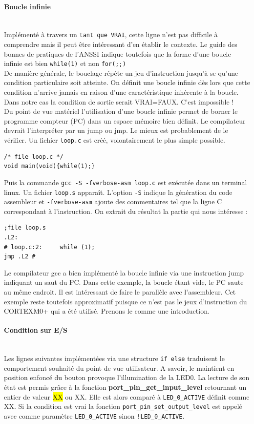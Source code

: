 \documentclass[a4paper]{article}
\begin{document}
\paragraph{Boucle infinie}
~~\\
Implémenté à travers un \texttt{tant que VRAI}, cette ligne n'est pas difficile à comprendre mais il peut être intéressant d'en établir le contexte. Le guide des bonnes de pratiques de l'ANSSI\cite{ANSSI2021} indique toutefois que la forme d'une boucle infinie est bien \texttt{while(1)} et non \texttt{for(;;)}\\
De manière générale, le bouclage répète un jeu d'instruction jusqu'à se qu'une condition particulaire soit atteinte. On définit une boucle infinie dès lors que cette condition n'arrive jamais en raison d'une caractéristique inhérente à la boucle. Dans notre cas la condition de sortie serait VRAI=FAUX. C'est impossible ! \\
Du point de vue matériel l'utilisation d'une boucle infinie permet de borner le programme compteur (PC) dans un espace mémoire bien définit. Le compilateur devrait l'interpréter par un jump ou jmp. Le mieux est probablement de le vérifier. Un fichier \texttt{loop.c} est créé, volontairement le plus simple possible.
\begin{lstlisting}[style=CStyle]
/* file loop.c */
void main(void){while(1);}
\end{lstlisting}
Puis la commande \texttt{gcc -S -fverbose-asm loop.c} est exécutée dans un terminal linux. Un fichier \texttt{loop.s} apparaît. L'option \texttt{-S} indique la génération du code assembleur et \texttt{-fverbose-asm} ajoute des commentaires tel que la ligne C correspondant à l'instruction. On extrait du résultat la partie qui nous intéresse :
\begin{lstlisting}[language={[x86masm]Assembler}]
;file loop.s
.L2:
# loop.c:2: 	while (1);
jmp	.L2	#
\end{lstlisting}
Le compilateur gcc a bien implémenté la boucle infinie via une instruction jump indiquant un saut du PC. Dans cette exemple, la boucle étant vide, le PC saute au même endroit. Il est intéressant de faire le parallèle avec l'assembleur. Cet exemple reste toutefois approximatif puisque ce n'est pas le jeux d'instruction du CORTEXM0+ qui a été utilisé. Prenons le comme une introduction.

\paragraph{Condition sur E/S}
~~\\
Les lignes suivantes implémentées via une structure \texttt{if else} traduisent le comportement souhaité du point de vue utilisateur. A savoir, le maintient en position enfoncé du bouton provoque l'illumination de la LED0. La lecture de son état est permis grâce à la fonction \textbf{port\_pin\_get\_input\_level} retournant un entier de valeur \hl{XX} ou XX. Elle est alors comparé à \texttt{LED\_0\_ACTIVE} définit comme XX. Si la condition est vrai la fonction \texttt{port\_pin\_set\_output\_level} est appelé avec comme paramètre \texttt{LED\_0\_ACTIVE} sinon \texttt{!LED\_0\_ACTIVE}.
\end{document}
